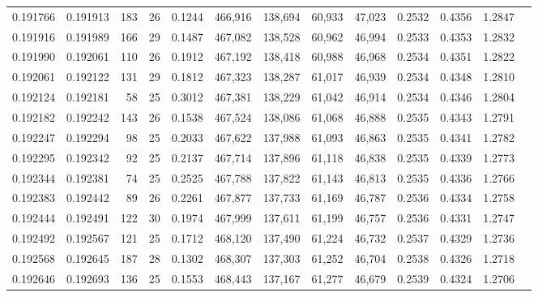 \begin{tabular}{rrrrrrrrrrrrr}
0.191766 & 0.191913 & 183 &  26 &                                     0.1244 & 466,916 & 138,694 &  60,933 &  47,023 & 0.2532 & 0.4356 & 1.2847 \\
0.191916 & 0.191989 & 166 &  29 &                                     0.1487 & 467,082 & 138,528 &  60,962 &  46,994 & 0.2533 & 0.4353 & 1.2832 \\
0.191990 & 0.192061 & 110 &  26 &                                     0.1912 & 467,192 & 138,418 &  60,988 &  46,968 & 0.2534 & 0.4351 & 1.2822 \\
0.192061 & 0.192122 & 131 &  29 &                                     0.1812 & 467,323 & 138,287 &  61,017 &  46,939 & 0.2534 & 0.4348 & 1.2810 \\
0.192124 & 0.192181 &  58 &  25 &                                     0.3012 & 467,381 & 138,229 &  61,042 &  46,914 & 0.2534 & 0.4346 & 1.2804 \\
0.192182 & 0.192242 & 143 &  26 &                                     0.1538 & 467,524 & 138,086 &  61,068 &  46,888 & 0.2535 & 0.4343 & 1.2791 \\
0.192247 & 0.192294 &  98 &  25 &                                     0.2033 & 467,622 & 137,988 &  61,093 &  46,863 & 0.2535 & 0.4341 & 1.2782 \\
0.192295 & 0.192342 &  92 &  25 &                                     0.2137 & 467,714 & 137,896 &  61,118 &  46,838 & 0.2535 & 0.4339 & 1.2773 \\
0.192344 & 0.192381 &  74 &  25 &                                     0.2525 & 467,788 & 137,822 &  61,143 &  46,813 & 0.2535 & 0.4336 & 1.2766 \\
0.192383 & 0.192442 &  89 &  26 &                                     0.2261 & 467,877 & 137,733 &  61,169 &  46,787 & 0.2536 & 0.4334 & 1.2758 \\
0.192444 & 0.192491 & 122 &  30 &                                     0.1974 & 467,999 & 137,611 &  61,199 &  46,757 & 0.2536 & 0.4331 & 1.2747 \\
0.192492 & 0.192567 & 121 &  25 &                                     0.1712 & 468,120 & 137,490 &  61,224 &  46,732 & 0.2537 & 0.4329 & 1.2736 \\
0.192568 & 0.192645 & 187 &  28 &                                     0.1302 & 468,307 & 137,303 &  61,252 &  46,704 & 0.2538 & 0.4326 & 1.2718 \\
0.192646 & 0.192693 & 136 &  25 &                                     0.1553 & 468,443 & 137,167 &  61,277 &  46,679 & 0.2539 & 0.4324 & 1.2706 \\

\end{tabular}
